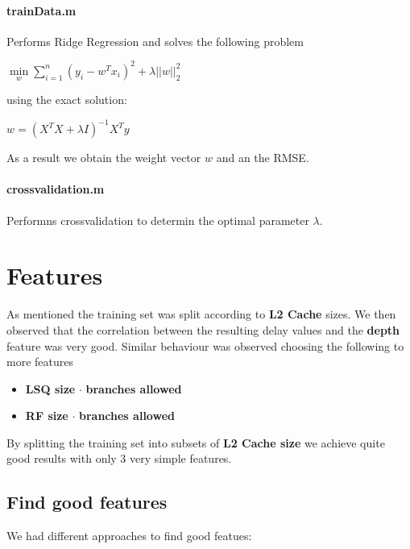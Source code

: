 \documentclass[a4paper, 11pt]{article}
\begin{document}
\paragraph{trainData.m}
Performs Ridge Regression and solves the following problem

$ \min \limits_w \sum \limits_{i=1}^n \left(y_i - w^Tx_i\right)^2 + \lambda ||w||_2^2$

using the exact solution:


$ w = \left(X^T X + \lambda I   \right)^{-1} X^T y$

As a result we obtain the weight vector $w$ and an the RMSE.

\paragraph{crossvalidation.m}

Performns crossvalidation to determin the optimal parameter $\lambda$.

\section{Features}

As mentioned the training set was split according to \textbf{L2 Cache} sizes. We then observed that the correlation between the resulting delay values and the \textbf{depth} feature was very good. Similar behaviour was observed choosing the following to more features

\begin{itemize}
\item  \textbf{LSQ size} $\cdot$  \textbf{branches allowed}

\item \textbf{RF size} $\cdot$ \textbf{branches allowed}
\end{itemize}

By splitting the training set into subsets of \textbf{L2 Cache size} we achieve quite good results with only 3 very simple features.





\subsection{Find good features}
\label{subsec:findgoodfeatures}

We had different approaches to find good featues:
\end{document}
